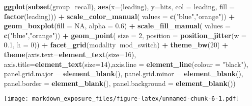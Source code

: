 \documentclass[]{article}
\newenvironment{Shaded}{\begin{snugshade}}{\end{snugshade}}
\newcommand{\DataTypeTok}[1]{\textcolor[rgb]{0.13,0.29,0.53}{#1}}
\newcommand{\DecValTok}[1]{\textcolor[rgb]{0.00,0.00,0.81}{#1}}
\newcommand{\FloatTok}[1]{\textcolor[rgb]{0.00,0.00,0.81}{#1}}
\newcommand{\KeywordTok}[1]{\textcolor[rgb]{0.13,0.29,0.53}{\textbf{#1}}}
\newcommand{\NormalTok}[1]{#1}
\newcommand{\OperatorTok}[1]{\textcolor[rgb]{0.81,0.36,0.00}{\textbf{#1}}}
\newcommand{\OtherTok}[1]{\textcolor[rgb]{0.56,0.35,0.01}{#1}}
\newcommand{\StringTok}[1]{\textcolor[rgb]{0.31,0.60,0.02}{#1}}
\begin{document}
\begin{Shaded}
\begin{Highlighting}[]
\KeywordTok{ggplot}\NormalTok{(}\KeywordTok{subset}\NormalTok{(group_recall), }\KeywordTok{aes}\NormalTok{(}\DataTypeTok{x=}\NormalTok{(leading), }\DataTypeTok{y=}\NormalTok{hits, }\DataTypeTok{col =}\NormalTok{ leading, }\DataTypeTok{fill =} \KeywordTok{factor}\NormalTok{(leading))) }\OperatorTok{+}\StringTok{ }
\StringTok{  }\KeywordTok{scale_color_manual}\NormalTok{( }\DataTypeTok{values =}  \KeywordTok{c}\NormalTok{(}\StringTok{"blue"}\NormalTok{,}\StringTok{"orange"}\NormalTok{)) }\OperatorTok{+}\StringTok{ }\KeywordTok{geom_boxplot}\NormalTok{(}\DataTypeTok{fill =} \OtherTok{NA}\NormalTok{, }\DataTypeTok{alpha =} \FloatTok{0.6}\NormalTok{) }\OperatorTok{+}\StringTok{ }\KeywordTok{scale_fill_manual}\NormalTok{( }\DataTypeTok{values =}  \KeywordTok{c}\NormalTok{(}\StringTok{"blue"}\NormalTok{,}\StringTok{"orange"}\NormalTok{)) }\OperatorTok{+}\StringTok{ }\KeywordTok{geom_point}\NormalTok{( }\DataTypeTok{size =} \DecValTok{2}\NormalTok{,  }\DataTypeTok{position =} \KeywordTok{position_jitter}\NormalTok{(}\DataTypeTok{w =} \FloatTok{0.1}\NormalTok{, }\DataTypeTok{h =} \DecValTok{0}\NormalTok{)) }\OperatorTok{+}\StringTok{ }\KeywordTok{facet_grid}\NormalTok{(modality}\OperatorTok{~}\NormalTok{mod_switch) }\OperatorTok{+}\StringTok{ }
\StringTok{  }\KeywordTok{theme_bw}\NormalTok{(}\DecValTok{20}\NormalTok{) }\OperatorTok{+}\StringTok{ }\KeywordTok{theme}\NormalTok{(}\DataTypeTok{axis.text=}\KeywordTok{element_text}\NormalTok{(}\DataTypeTok{size=}\DecValTok{16}\NormalTok{), }\DataTypeTok{axis.title=}\KeywordTok{element_text}\NormalTok{(}\DataTypeTok{size=}\DecValTok{14}\NormalTok{),}\DataTypeTok{axis.line =} \KeywordTok{element_line}\NormalTok{(}\DataTypeTok{colour =} \StringTok{"black"}\NormalTok{),}
                       \DataTypeTok{panel.grid.major =} \KeywordTok{element_blank}\NormalTok{(),}
                       \DataTypeTok{panel.grid.minor =} \KeywordTok{element_blank}\NormalTok{(),}
                       \DataTypeTok{panel.border =} \KeywordTok{element_blank}\NormalTok{(),}
                       \DataTypeTok{panel.background =} \KeywordTok{element_blank}\NormalTok{())}
\end{Highlighting}
\end{Shaded}

\texttt{[image: markdown\_exposure\_files/figure-latex/unnamed-chunk-6-1.pdf]}
\end{document}
